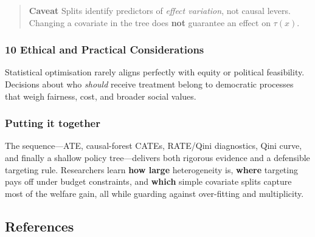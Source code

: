 \documentclass[
  single column]{article}
\begin{document}
\begin{quote}
\textbf{Caveat} Splits identify predictors of \emph{effect variation},
not causal levers. Changing a covariate in the tree does \textbf{not}
guarantee an effect on \(\tau(x)\).
\end{quote}

\subsubsection{10 Ethical and Practical
Considerations}\label{ethical-and-practical-considerations}

Statistical optimisation rarely aligns perfectly with equity or
political feasibility. Decisions about who \emph{should} receive
treatment belong to democratic processes that weigh fairness, cost, and
broader social values.

\subsubsection{Putting it together}\label{putting-it-together}

The sequence---ATE, causal-forest CATEs, RATE/Qini diagnostics, Qini
curve, and finally a shallow policy tree---delivers both rigorous
evidence and a defensible targeting rule. Researchers learn \textbf{how
large} heterogeneity is, \textbf{where} targeting pays off under budget
constraints, and \textbf{which} simple covariate splits capture most of
the welfare gain, all while guarding against over-fitting and
multiplicity.

\newpage{}

\subsection*{References}\label{references}
\end{document}
